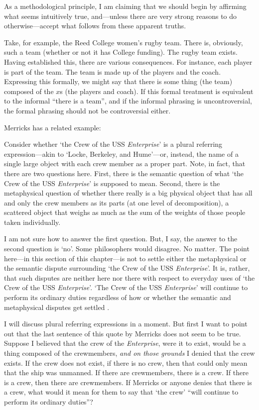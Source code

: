 \documentclass[11pt]{article}
\newenvironment{squote}{%
\begin{spacing}{1}
       	\begin{list}{}{%
\setlength{\labelwidth}{0pt}%
\rightmargin\leftmargin%
}
\item\relax
}{%
\end{list}%
\end{spacing}
}
\begin{document}
\begin{spacing}{1.25}
As a methodological principle, I am claiming that we should begin by
affirming what seems intuitively true, and---unless there are very
strong reasons to do otherwise---accept what follows from these
apparent truths.

Take, for example, the Reed College women's rugby team.  There is,
obviously, such a team (whether or not it has College funding).  The
rugby team exists.  Having established this, there are various
consequences.  For instance, each player is part of the team.  The
team is made up of the players and the coach.  Expressing this
formally, we might say that there is some thing (the team) composed of
the $x$s (the players and coach).  If this formal treatment is
equivalent to the informal ``there is a team'', and if the informal
phrasing is uncontroversial, the formal phrasing should not be
controversial either.

Merricks has a related example:

\begin{squote}
Consider whether `the Crew of the USS {\em Enterprise}' is a plural
referring expression---akin to `Locke, Berkeley, and Hume'---or,
instead, the name of a single large object with each crew member as a
proper part.  Note, in fact, that there are two questions here.
First, there is the semantic question of what `the Crew of the USS
{\em Enterprise}' is supposed to mean.  Second, there is the
metaphysical question of whether there really is a big physical object
that has all and only the crew members as its parts (at one level of
decomposition), a scattered object that weighs as much as the sum of
the weights of those people taken individually.

I am not sure how to answer the first question.  But, I say, the
answer to the second question is `no'.  Some philosophers would
disagree.  No matter.  The point here---in this section of this
chapter---is not to settle either the metaphysical or the semantic
dispute surrounding `the Crew of the USS {\em Enterprise}'.  It is,
rather, that such disputes are neither here nor there with respect to
everyday uses of `the Crew of the USS {\em Enterprise}'.  `The Crew of
the USS {\em Enterprise}' will continue to perform its ordinary duties
regardless of how or whether the semantic and metaphysical disputes
get settled \citeyearpar[10]{merricks2001a}.
\end{squote}

I will discuss plural referring expressions in a moment.  But first I
want to point out that the last sentence of this quote by Merricks
does not seem to be true.  Suppose I believed that the crew of the
{\em Enterprise}, were it to exist, would be a thing composed of the
crewmembers, {\em and on those grounds} I denied that the crew exists.
If the crew does not exist, if there is no crew, then that could only
mean that the ship was unmanned.  If there are crewmembers, there is a
crew.  If there is a crew, then there are crewmembers.  If Merricks or
anyone denies that there is a crew, what would it mean for them to say
that `the crew' ``will continue to perform its ordinary duties''?


\end{spacing}
\end{document}
